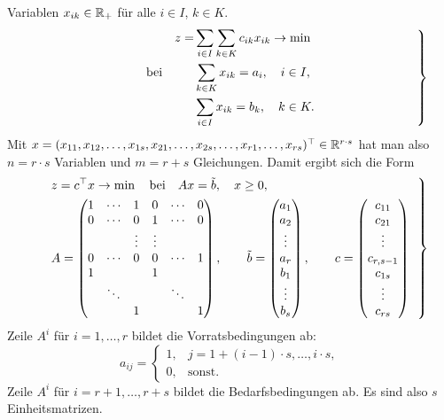 Variablen $x_{ik} \in \mathbb{R}_+$ für alle $i \in I$, $k \in K$.
\begin{equation}\groupequation{
  \begin{aligned}
    & & z = &\sum_{i \in I} \sum_{k \in K} c_{ik} x_{ik} \to \min \\
    &\text{bei} &
    &\sum_{k \in K} x_{ik} = a_i, \quad i \in I, \\
    & &
    &\sum_{i \in I} x_{ik} = b_k, \quad k \in K.
  \end{aligned}
}\end{equation}
Mit $x = (x_ {11}, x_{12}, \ldots, x_{1s}, x_{21}, \ldots, x_{2s}, \ldots,
x_{r1}, \ldots, x_{rs})^\top \in \mathbb{R}^{r \cdot s}$ hat man also $n = r \cdot s$
Variablen und $m = r + s$ Gleichungen. Damit ergibt sich die Form
\begin{equation}\groupequation{
  \begin{aligned}
    &z = c^\top x \to \min \subjto Ax = \tilde{b}, \quad x \ge 0, \\
    &A = \begin{pmatrix}
      1 & \cdots & 1 & 0 & \cdots & 0 \\
      0 & \cdots & 0 & 1 & \cdots & 0 \\
      & & \vdots & \vdots \\
      0 & \cdots & 0 & 0 & \cdots & 1 \\
      1 & & & 1 \\
      & \ddots & & &\ddots \\
      & & 1 & & & 1
    \end{pmatrix},
    \qquad
    \tilde{b} = \begin{pmatrix}
      a_1 \\ a_2 \\ \vdots \\ a_r \\ b_1 \\ \vdots \\ b_s
    \end{pmatrix},
    \qquad
    c = \pmat{c_{11} \\ c_{21} \\ \vdots \\ c_{r,s-1} \\ c_{1s} \\ \vdots \\ c_{rs}}
  \end{aligned}
}\end{equation}
Zeile $A^i$ für $i = 1, \ldots, r$ bildet die
Vorratsbedingungen ab:
\[a_{ij} = \begin{cases}
    1, &j = 1 + (i-1) \cdot s, \ldots, i \cdot s, \\
    0, &\text{sonst.} 
  \end{cases}
\]
Zeile $A^i$ für $i = r+1, \ldots, r+s$ bildet die Bedarfsbedingungen ab. Es sind
also $s$ Einheitsmatrizen.


